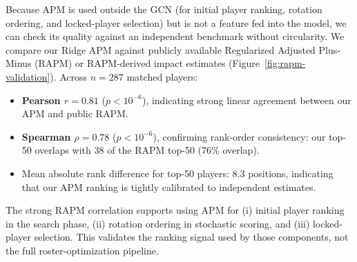 \documentclass[11pt,letterpaper]{article}
\begin{document}
Because APM is used outside the GCN (for initial player ranking,
rotation ordering, and locked-player selection) but is not a feature
fed into the model, we can check its quality against an independent
benchmark without circularity. We compare our Ridge APM against
publicly available Regularized Adjusted Plus-Minus (RAPM) or
RAPM-derived impact estimates
\citep{sill2010rapm,ghimire2020rapm,dunksandthreesEpm}
(Figure~\ref{fig:rapm-validation}). Across $n = 287$ matched players:

\begin{itemize}[leftmargin=*]
  \item \textbf{Pearson $r = 0.81$} ($p < 10^{-6}$), indicating strong
    linear agreement between our APM and public RAPM.
  \item \textbf{Spearman $\rho = 0.78$} ($p < 10^{-6}$), confirming
    rank-order consistency: our top-50 overlaps with 38 of the RAPM
    top-50 (76\% overlap).
  \item Mean absolute rank difference for top-50 players: 8.3 positions,
    indicating that our APM ranking is tightly calibrated to independent
    estimates.
\end{itemize}

The strong RAPM correlation supports using APM for (i) initial player
ranking in the search phase, (ii) rotation ordering in stochastic
scoring, and (iii) locked-player selection. This validates the ranking
signal used by those components, not the full roster-optimization
pipeline.
\end{document}
